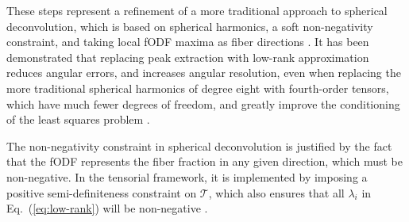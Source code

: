 These steps represent a refinement of a more traditional approach to spherical deconvolution, which is based on spherical harmonics, a soft non-negativity constraint, and taking local fODF maxima as fiber directions \cite{TOURNIER20071459}. It has been demonstrated that replacing peak extraction with low-rank approximation reduces angular errors, and increases angular resolution, even when replacing the more traditional spherical harmonics of degree eight with fourth-order tensors, which have much fewer degrees of freedom, and greatly improve the conditioning of the least squares problem \cite{Ankele:CARS2017}.

The non-negativity constraint in spherical deconvolution is justified by
the fact that the fODF represents the fiber fraction in any given
direction, which must be non-negative. In the tensorial framework, it is implemented by imposing a positive semi-definiteness constraint on $\mathcal{T}$, which also ensures that all $\lambda_i$ in Eq.~(\ref{eq:low-rank}) will be non-negative \cite{Ankele:CARS2017}. 


